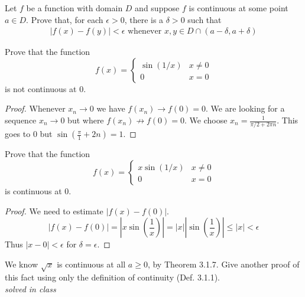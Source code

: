 \documentclass[12pt]{book}
\newenvironment{exercise}[2][Exercise]{\begin{trivlist}
\item[\hskip \labelsep {\bfseries #1}\hskip \labelsep {\bfseries #2.}]}{\end{trivlist}}
\begin{document}
\begin{exercise}{3.1.10}
Let $f$ be a function with domain $D$ and suppose $f$ is continuous at some point $a \in D$. Prove that, for each $\epsilon >0$, there is a $\delta >0$ such that
	\begin{align*}
	|f(x) - f(y) | < \epsilon \text{ whenever } x,y \in D \cap (a-\delta,a+ \delta)
	\end{align*}
\end{exercise}

\begin{exercise}{3.1.11}
    Prove that the function
        \[ f(x)= \begin{cases} \sin (1/x) & x\neq 0 \\ 0 & x =0 \end{cases} \]
    is not continuous at 0.
    
    \begin{proof}
    Whenever $x_n \to 0$ we have $f(x_n) \to f(0) = 0$. We are looking for a sequence $x_n \to 0$ but where $f(x_n) \not\to f(0)=0$. We choose $x_n = \frac{1}{\pi/2 + 2 \pi n}$. This goes to 0 but $\sin(\frac{\pi}{1} +2n)=1$.
    \end{proof}
\end{exercise}



\begin{exercise}{3.1.12}
    Prove that the function
        \[ f(x)= \begin{cases} x \sin(1/x) & x \neq 0 \\ 0 & x=0 \end{cases} \]
    is continuous at 0.
    
    \begin{proof}
    We need to estimate $|f(x)-f(0)|$.
    \[ |f(x)-f(0)| = |x \sin \left(\frac{1}{x} \right)| = |x| |\sin \left( \frac{1}{x} \right)| \leq |x| < \epsilon \]
    Thus $|x-0|<\epsilon$ for $\delta = \epsilon$.
    \end{proof}
\end{exercise}







\begin{exercise}{3.1.8}
We know $\sqrt{x}$ is continuous at all $a \geq 0$, by Theorem 3.1.7. Give another proof of this fact using only the definition of continuity (Def. 3.1.1). \\

\emph{solved in class}
\end{exercise}
\end{document}
